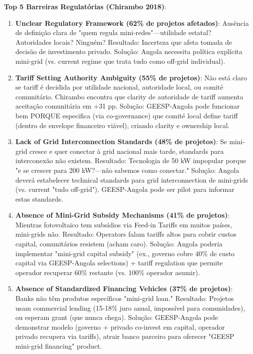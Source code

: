\documentclass[12pt, a4paper]{article}
\begin{document}
\textbf{Top 5 Barreiras Regulatórias (Chirambo 2018)}:
\begin{enumerate}
\item \textbf{Unclear Regulatory Framework (62\% de projetos afetados)}: Ausência de definição clara de "quem regula mini-redes"—utilidade estatal? Autoridades locais? Ninguém? Resultado: Incerteza que afeta tomada de decisão de investimento privado. Solução: Angola necessita política explícita mini-grid (vs. current regime que trata tudo como off-grid individual).

\item \textbf{Tariff Setting Authority Ambiguity (55\% de projetos)}: Não está claro se tariff é decidida por utilidade nacional, autoridade local, ou comité comunitário. Chirambo encontra que clarity de autoridade de tariff aumenta aceitação comunitária em +31 pp. Solução: GEESP-Angola pode funcionar bem PORQUE especifica (via co-governance) que comité local define tariff (dentro de envelope financeiro viável), criando clarity e ownership local.

\item \textbf{Lack of Grid Interconnection Standards (48\% de projetos)}: Se mini-grid cresce e quer conectar à grid nacional mais tarde, standards para interconexão não existem. Resultado: Tecnologia de 50 kW impopular porque "e se crescer para 200 kW?—não sabemos como conectar." Solução: Angola deverá estabelecer technical standards para grid interconnection de mini-grids (vs. current "tudo off-grid"). GEESP-Angola pode ser pilot para informar estas standards.

\item \textbf{Absence of Mini-Grid Subsidy Mechanisms (41\% de projetos)}: Mientras fotovoltaico tem subsídios via Feed-in Tariffs em muitos países, mini-grids não. Resultado: Operators falam tariffs altos para cobrir custos capital, comunitários resistem (acham caro). Solução: Angola poderia implementar "mini-grid capital subsidy" (ex., governo cobre 40\% de custo capital via GEESP-Angola selections) + tariff regulation que permite operador recuperar 60\% restante (vs. 100\% operador asumir).

\item \textbf{Absence of Standardized Financing Vehicles (37\% de projetos)}: Banks não têm produtos específicos "mini-grid loan." Resultado: Projetos usam commercial lending (15-18\% juro anual, impossível para comunidades), ou esperam grant (que nunca chega). Solução: GEESP-Angola pode demonstrar modelo (governo + privado co-invest em capital, operador privado recupera via tariffs), atrair banco parceiro para oferecer "GEESP mini-grid financing" product.

\end{enumerate}
\end{document}
